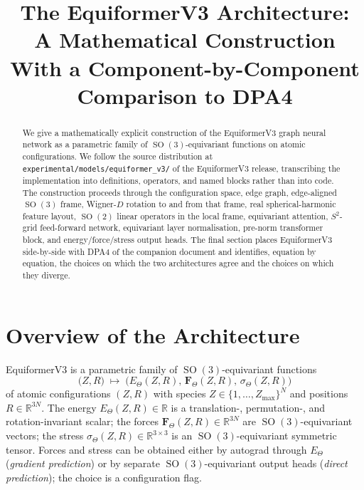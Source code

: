\documentclass[11pt,a4paper]{article}
\title{The EquiformerV3 Architecture:\\ A Mathematical Construction\\ {\large With a Component-by-Component Comparison to DPA4}}
\author{}
\date{}
\DeclareMathOperator{\SO}{SO}
\newcommand{\R}{\mathbb{R}}
\newcommand{\Sph}{S^2}
\newcommand{\bmF}{\bm{F}}
\theoremstyle{plain}
\theoremstyle{definition}
\theoremstyle{remark}
\begin{document}
\maketitle

\begin{abstract}
    We give a mathematically explicit construction of the EquiformerV3 graph neural network as a parametric family of $\SO(3)$-equivariant functions on atomic configurations.
    We follow the source distribution at \texttt{experimental/models/equiformer\_v3/} of the EquiformerV3 release, transcribing the implementation into definitions, operators, and named blocks rather than into code.
    The construction proceeds through the configuration space, edge graph, edge-aligned $\SO(3)$ frame, Wigner-$D$ rotation to and from that frame, real spherical-harmonic feature layout, $\SO(2)$ linear operators in the local frame, equivariant attention, $\Sph$-grid feed-forward network, equivariant layer normalisation, pre-norm transformer block, and energy/force/stress output heads.
    The final section places EquiformerV3 side-by-side with DPA4 of the companion document and identifies, equation by equation, the choices on which the two architectures agree and the choices on which they diverge.
\end{abstract}

\tableofcontents

\section{Overview of the Architecture}\label{sec:ov}

EquiformerV3 is a parametric family of $\SO(3)$-equivariant functions
\begin{equation}\label{eq:overall}
    \bigl(Z,R\bigr)\;\longmapsto\;\bigl(E_\Theta(Z,R),\,\bmF_\Theta(Z,R),\,\sigma_\Theta(Z,R)\bigr)
\end{equation}
of atomic configurations $(Z,R)$ with species $Z\in\{1,\dots,Z_{\max}\}^N$ and positions $R\in\R^{3N}$.
The energy $E_\Theta(Z,R)\in\R$ is a translation-, permutation-, and rotation-invariant scalar; the forces $\bmF_\Theta(Z,R)\in\R^{3N}$ are $\SO(3)$-equivariant vectors; the stress $\sigma_\Theta(Z,R)\in\R^{3\times 3}$ is an $\SO(3)$-equivariant symmetric tensor.
Forces and stress can be obtained either by autograd through $E_\Theta$ (\emph{gradient prediction}) or by separate $\SO(3)$-equivariant output heads (\emph{direct prediction}); the choice is a configuration flag.
\end{document}
